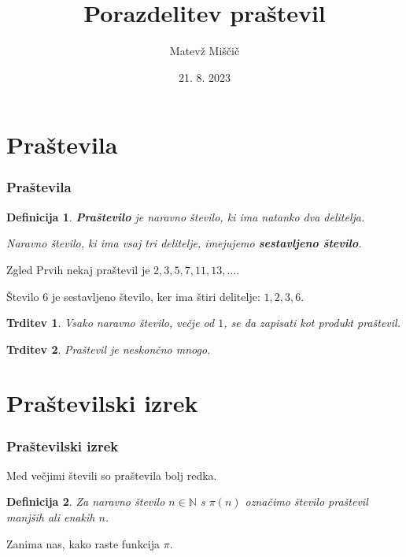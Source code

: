 \documentclass{beamer}
\newtheorem{definicija}{Definicija}
\newtheorem{trditev}{Trditev}
\def\N{\mathbb{N}}
\begin{document}

\title{Porazdelitev praštevil}
\author{Matevž Miščič}
\date{21. 8. 2023}
\begin{frame}
   \titlepage
\end{frame}


\section{Praštevila}
\begin{frame}
    \frametitle{Praštevila}
    \pause
    \begin{definicija}
        \textbf{Praštevilo} je naravno število, ki ima natanko dva delitelja.

        Naravno število, ki ima vsaj tri delitelje, imejujemo \textbf{sestavljeno število}.
    \end{definicija}
    \pause
    \medskip
    \begin{exampleblock}{Zgled}
        Prvih nekaj praštevil je $2, 3, 5, 7, 11, 13, \ldots$.

        Število $6$ je sestavljeno število, ker ima štiri delitelje: $1, 2, 3, 6$.
    \end{exampleblock}
 \end{frame}


\begin{frame}
    \begin{trditev}
        Vsako naravno število, večje od $1$, se da zapisati kot produkt praštevil.
    \end{trditev}
    \bigskip
    \pause
    \begin{trditev}
        Praštevil je neskončno mnogo.
    \end{trditev}
\end{frame}


\section{Praštevilski izrek}
\begin{frame}
    \frametitle{Praštevilski izrek}
    Med večjimi števili so praštevila bolj redka.
    \pause
    \medskip
    \begin{definicija}
        Za naravno število $n \in \N$ s \textbf{$\pi(n)$} označimo število praštevil manjših ali enakih $n$.
    \end{definicija}
    \pause
    \medskip
    Zanima nas, kako raste funkcija $\pi$.
\end{frame}
\end{document}
